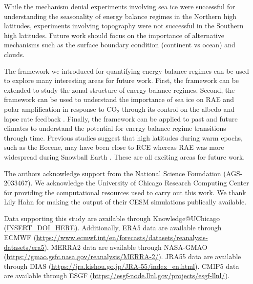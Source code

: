 \documentclass{ametsocV5}
\begin{document}
While the mechanism denial experiments involving sea ice were successful for understanding the seasonality of energy balance regimes in the Northern high latitudes, experiments involving topography were not successful in the Southern high latitudes. Future work should focus on the importance of alternative mechanisms such as the surface boundary condition (continent vs ocean) and clouds.

The framework we introduced for quantifying energy balance regimes can be used to explore many interesting areas for future work. First, the framework can be extended to study the zonal structure of energy balance regimes. Second, the framework can be used to understand the importance of sea ice on RAE and polar amplification in response to CO$_2$ through its control on the albedo and lapse rate feedback \citep{feldl2020}. Finally, the framework can be applied to past and future climates to understand the potential for energy balance regime transitions through time. Previous studies suggest that high latitudes during warm epochs, such as the Eocene, may have been close to RCE \citep{abbot2008a} whereas RAE was more widespread during Snowball Earth \citep{pierrehumbert2005}. These are all exciting areas for future work.

\acknowledgments
The authors acknowledge support from the National Science Foundation (AGS-2033467). We acknowledge the University of Chicago Research Computing Center for providing the computational resources used to carry out this work. We thank Lily Hahn for making the output of their CESM simulations publically available.

% 
%
\datastatement
Data supporting this study are available through Knowledge@UChicago (\url{INSERT_DOI_HERE}). Additionally, ERA5 data are available through ECMWF (\url{https://www.ecmwf.int/en/forecasts/datasets/reanalysis-datasets/era5}). MERRA2 data are available through NASA-GMAO (\url{https://gmao.gsfc.nasa.gov/reanalysis/MERRA-2/}). JRA55 data are available through DIAS (\url{https://jra.kishou.go.jp/JRA-55/index_en.html}). CMIP5 data are available through ESGF (\url{https://esgf-node.llnl.gov/projects/esgf-llnl/}). 

%
\end{document}
